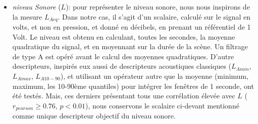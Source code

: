 \begin{itemize}
\begin{itemize}
\item \emph{niveau Sonore} ($L$): pour représenter le niveau sonore, nous nous inspirons de la mesure $L_{Aeq}$. Dans notre cas, il s'agit d'un scalaire, calculé sur le signal en volts, et non en pression, et donné en décibels, en prenant un référentiel de 1 Volt. Le niveau est obtenu en calculant, toutes les secondes, la moyenne quadratique du signal, et en moyennant sur la durée de la scène. Un filtrage de type A est opéré avant le calcul des moyennes quadratiques. D'autre descripteurs, inspirés eux aussi de descripteurs acoustiques classiques ($L_{Amin}$, $L_{Amax}$, $L_{A10-90}$), et utilisant un opérateur autre que la moyenne (minimum, maximum, les 10-90ème quantiles) pour intégrer les fenêtres de 1 seconde, ont été testés. Mais, ces derniers présentant tous une corrélation élevée avec $L$ ($r_{pearson}\geq0.76$, $p<0.01$), nous conservons le scalaire ci-devant mentionné comme unique descripteur objectif du niveau sonore.
\end{itemize}
\end{itemize}

